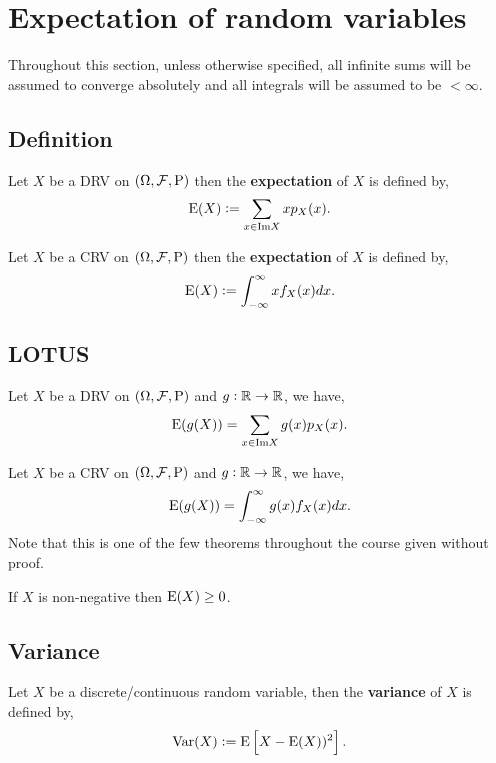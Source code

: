 \section{Expectation of random variables}
Throughout this section, unless otherwise specified, all infinite sums will be assumed to converge absolutely and all integrals will be assumed to be $<\infty$.
\subsection{Definition}

\begingroup\belowdisplayskip=-10pt
\begin{definition}
    Let $X$ be a DRV on $(\Omega,\mathcal{F},\mathrm{P})$ then the \textbf{expectation} of $X$ is defined by, \[
        \mathrm{E}(X) := \sum_{x\in\text{Im}X}xp_X(x) \textcolor{black}{.}
    \]
\end{definition}
\endgroup

\begingroup\belowdisplayskip=-10pt
\begin{definition}
    Let $X$ be a CRV on $(\Omega,\mathcal{F},\mathrm{P})$ then the \textbf{expectation} of $X$ is defined by, \[
        \mathrm{E}(X) := \int_{-\infty}^{\infty}xf_X(x)dx \textcolor{black}{.}
    \]
\end{definition}
\endgroup
\subsection{LOTUS}

\begingroup\belowdisplayskip=-10pt
\begin{theorem}
    Let $X$ be a DRV on $(\Omega,\mathcal{F},\mathrm{P})$ and $g:\mathbb{R}\rightarrow\mathbb{R}$, we have, \[
        \mathrm{E}(g(X)) = \sum_{x\in\text{Im}X}g(x)p_X(x) \textcolor{black}{.}
    \]
\end{theorem}
\endgroup

\begin{theorem}
    Let $X$ be a CRV on $(\Omega,\mathcal{F},\mathrm{P})$ and $g:\mathbb{R}\rightarrow\mathbb{R}$, we have, \[
        \mathrm{E}(g(X)) = \int_{-\infty}^{\infty}g(x)f_X(x)dx \textcolor{black}{.}
    \]
    Note that this is one of the few theorems throughout the course given without proof.
\end{theorem}

\begin{theorem}
    If $X$ is non-negative then $\mathrm{E}(X)\geq0$.
\end{theorem}

\subsection{Variance}
\begingroup\belowdisplayskip=-20pt
\begin{definition}[Variance]
    Let $X$ be a discrete/continuous random variable, then the \textbf{variance} of $X$ is defined by, \[
        \text{Var}(X) := \mathrm{E}\left[X-\mathrm{E}(X))^2\right]\textcolor{black}{.}
    \]
\end{definition}

